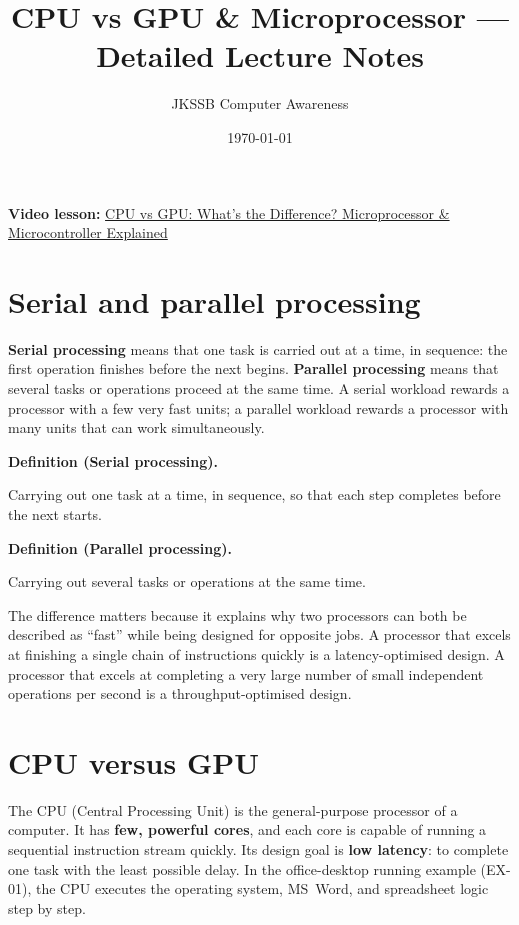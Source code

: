 \documentclass[11pt]{article}
\title{CPU vs GPU \& Microprocessor --- Detailed Lecture Notes}
\author{JKSSB Computer Awareness}
\date{\today}
\newenvironment{definitionbox}[1]{%
  \par\noindent\textbf{Definition (#1).}\ \itshape
}{\par\vspace{0.3em}}
\begin{document}
\maketitle

\noindent\textbf{Video lesson:}
\href{https://youtu.be/Vaod5Ox7lzM}{CPU vs GPU: What's the Difference? Microprocessor \& Microcontroller Explained}

\section{Serial and parallel processing}
\textbf{Serial processing} means that one task is carried out at a time, in
sequence: the first operation finishes before the next begins. \textbf{Parallel
processing} means that several tasks or operations proceed at the same time.
A serial workload rewards a processor with a few very fast units; a parallel
workload rewards a processor with many units that can work simultaneously.

\begin{definitionbox}{Serial processing}
Carrying out one task at a time, in sequence, so that each step completes
before the next starts.
\end{definitionbox}

\begin{definitionbox}{Parallel processing}
Carrying out several tasks or operations at the same time.
\end{definitionbox}

The difference matters because it explains why two processors can both be
described as ``fast'' while being designed for opposite jobs. A processor that
excels at finishing a single chain of instructions quickly is a
latency-optimised design. A processor that excels at completing a very large
number of small independent operations per second is a
throughput-optimised design.

\section{CPU versus GPU}
The CPU (Central Processing Unit) is the general-purpose processor of a
computer. It has \textbf{few, powerful cores}, and each core is capable of
running a sequential instruction stream quickly. Its design goal is
\textbf{low latency}: to complete one task with the least possible delay. In
the office-desktop running example (EX-01), the CPU executes the operating
system, \mbox{MS Word}, and spreadsheet logic step by step.
\end{document}
